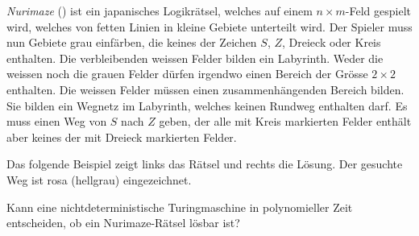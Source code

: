 {\em Nurimaze}
()
ist ein japanisches Logikrätsel, welches auf einem
$n\times m$-Feld gespielt wird,
welches von fetten Linien in kleine Gebiete unterteilt wird.
Der Spieler muss nun
Gebiete grau einfärben, die keines der Zeichen $S$, $Z$, Dreieck oder
Kreis enthalten.
Die verbleibenden weissen Felder bilden ein Labyrinth.
Weder die weissen noch die grauen Felder dürfen irgendwo einen Bereich
der Grösse $2\times 2$ enthalten.
Die weissen Felder müssen einen zusammenhängenden Bereich bilden.
Sie bilden ein Wegnetz im Labyrinth, welches keinen Rundweg enthalten darf.
Es muss einen Weg von $S$ nach $Z$ geben, der alle mit Kreis markierten 
Felder enthält aber keines der mit Dreieck markierten Felder.

Das folgende Beispiel zeigt links das Rätsel und rechts die Lösung.
Der gesuchte Weg ist rosa (hellgrau) eingezeichnet.

\begin{center}
\end{center}
Kann eine nichtdeterministische Turingmaschine in polynomieller Zeit
entscheiden, ob ein Nurimaze-Rätsel lösbar ist?


